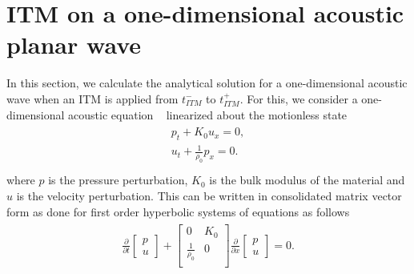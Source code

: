 \section{\texorpdfstring{\ac{ITM} on a one-dimensional acoustic planar wave}{ITM on a one-dimensional acoustic planar wave}}\label{section:ITMAcoustic}
In this section, we calculate the analytical solution for a one-dimensional acoustic wave when an \ac{ITM} is applied from $t_{ITM}^-$ to $t_{ITM}^+$.
For this, we consider a one-dimensional acoustic equation ~\parencite[Sec. 2.8]{leveque_2002} linearized about the motionless state
\begin{align}
    \begin{split}
        p_t + K_0u_x = 0, \\
        u_t + \frac{1}{\rho_0}p_x = 0 .\\
    \end{split}
\end{align}
where $p$ is the pressure perturbation, $K_0$ is the bulk modulus of the material and $u$ is the velocity perturbation. 
This can be written in consolidated matrix vector form as done for first order hyperbolic systems of equations as follows
\begin{align}
    \begin{split}
        \frac{\partial }{\partial t}
    \begin{bmatrix}
        p \\
        u
    \end{bmatrix} + 
    \begin{bmatrix}
        0 & K_0 \\
        \frac{1}{\rho_0} & 0 \\
    \end{bmatrix}
    \frac{\partial }{\partial x}
    \begin{bmatrix}
        p \\
        u
    \end{bmatrix} = 0 .
    \end{split}
    \label{eq:acoustic}
\end{align}

